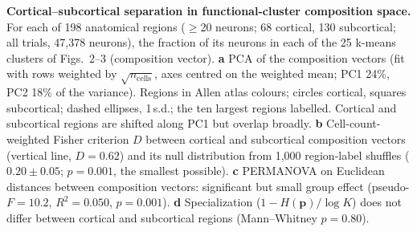 \caption{\textbf{Cortical--subcortical separation in functional-cluster composition space.}
For each of 198 anatomical regions ($\geq$20 neurons; 68 cortical, 130 subcortical; all trials, 47,378 neurons), the fraction of its neurons in each of the 25 k-means clusters of Figs.~2--3 (composition vector).
\textbf{a} PCA of the composition vectors (fit with rows weighted by $\sqrt{n_\mathrm{cells}}$, axes centred on the weighted mean; PC1 24\%, PC2 18\% of the variance). Regions in Allen atlas colours; circles cortical, squares subcortical; dashed ellipses, 1\,s.d.; the ten largest regions labelled. Cortical and subcortical regions are shifted along PC1 but overlap broadly.
\textbf{b} Cell-count-weighted Fisher criterion $D$ between cortical and subcortical composition vectors (vertical line, $D=0.62$) and its null distribution from 1,000 region-label shuffles ($0.20\pm0.05$; $p=0.001$, the smallest possible).
\textbf{c} PERMANOVA on Euclidean distances between composition vectors: significant but small group effect (pseudo-$F=10.2$, $R^2=0.050$, $p=0.001$).
\textbf{d} Specialization ($1-H(\mathbf{p})/\log K$) does not differ between cortical and subcortical regions (Mann--Whitney $p=0.80$).}
\label{fig:cortical_subcortical_specialization}
